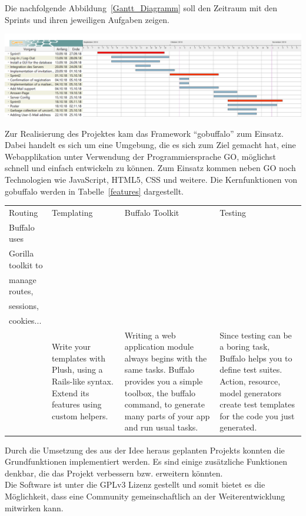 \documentclass[landscape,a0paper,fontscale=0.35]{baposter} %
\begin{document}
\begin{poster}
{	Die nachfolgende Abbildung~\ref{Gantt_Diagramm} soll den Zeitraum mit den Sprints und ihren jeweiligen Aufgaben zeigen.
	\begin{center}
		\includegraphics[width=0.7\linewidth]{GanttDiagramm.PNG}
		\label{Gantt_Diagramm}
	\end{center}
}


{
	Zur Realisierung des Projektes kam das Framework \enquote{gobuffalo} zum Einsatz. Dabei handelt es sich um eine Umgebung, die es sich zum Ziel gemacht hat, eine Webapplikation unter Verwendung der Programmiersprache GO, möglichst schnell und einfach entwickeln zu können. Zum Einsatz kommen neben GO noch Technologien wie JavaScript, HTML5, CSS und weitere. Die Kernfunktionen von gobuffalo werden in Tabelle~\ref{features} dargestellt.
	\begin{center}
		\begin{tabu}{ l l l l }
			Routing & Templating & Buffalo Toolkit & Testing \\
			\tabucline[1pt]{-}
			Buffalo uses\\ Gorilla toolkit to\\ manage routes,\\ sessions,\\ cookies...\\ & Write your templates with Plush, using a Rails-like syntax. Extend its features using custom helpers. & Writing a web application module always begins with the same tasks. Buffalo provides you a simple toolbox, the buffalo command, to generate many parts of your app and run usual tasks. & Since testing can be a boring task, Buffalo helps you to define test suites. Action, resource, model generators create test templates for the code you just generated.
		\end{tabu}
	\label{features}
	\end{center}
}


{
	Durch die Umsetzung des aus der Idee heraus geplanten Projekts konnten die Grundfunktionen implementiert werden. Es sind einige zusätzliche Funktionen denkbar, die das Projekt verbessern bzw. erweitern könnten.\\
	Die Software ist unter die GPLv3 Lizenz gestellt und somit bietet es die Möglichkeit, dass eine Community gemeinschaftlich an der Weiterentwicklung mitwirken kann.\\

}
\end{poster}
\end{document}
